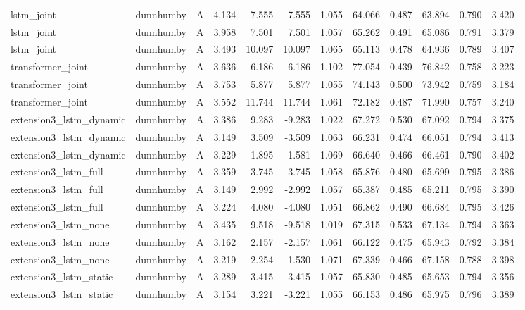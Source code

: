 \begin{table}
\begin{tabular}{lllrrrrrrrrr}
lstm_joint & dunnhumby & A & 4.134 & 7.555 & 7.555 & 1.055 & 64.066 & 0.487 & 63.894 & 0.790 & 3.420 \\
lstm_joint & dunnhumby & A & 3.958 & 7.501 & 7.501 & 1.057 & 65.262 & 0.491 & 65.086 & 0.791 & 3.379 \\
lstm_joint & dunnhumby & A & 3.493 & 10.097 & 10.097 & 1.065 & 65.113 & 0.478 & 64.936 & 0.789 & 3.407 \\
transformer_joint & dunnhumby & A & 3.636 & 6.186 & 6.186 & 1.102 & 77.054 & 0.439 & 76.842 & 0.758 & 3.223 \\
transformer_joint & dunnhumby & A & 3.753 & 5.877 & 5.877 & 1.055 & 74.143 & 0.500 & 73.942 & 0.759 & 3.184 \\
transformer_joint & dunnhumby & A & 3.552 & 11.744 & 11.744 & 1.061 & 72.182 & 0.487 & 71.990 & 0.757 & 3.240 \\
extension3_lstm_dynamic & dunnhumby & A & 3.386 & 9.283 & -9.283 & 1.022 & 67.272 & 0.530 & 67.092 & 0.794 & 3.375 \\
extension3_lstm_dynamic & dunnhumby & A & 3.149 & 3.509 & -3.509 & 1.063 & 66.231 & 0.474 & 66.051 & 0.794 & 3.413 \\
extension3_lstm_dynamic & dunnhumby & A & 3.229 & 1.895 & -1.581 & 1.069 & 66.640 & 0.466 & 66.461 & 0.790 & 3.402 \\
extension3_lstm_full & dunnhumby & A & 3.359 & 3.745 & -3.745 & 1.058 & 65.876 & 0.480 & 65.699 & 0.795 & 3.386 \\
extension3_lstm_full & dunnhumby & A & 3.149 & 2.992 & -2.992 & 1.057 & 65.387 & 0.485 & 65.211 & 0.795 & 3.390 \\
extension3_lstm_full & dunnhumby & A & 3.224 & 4.080 & -4.080 & 1.051 & 66.862 & 0.490 & 66.684 & 0.795 & 3.426 \\
extension3_lstm_none & dunnhumby & A & 3.435 & 9.518 & -9.518 & 1.019 & 67.315 & 0.533 & 67.134 & 0.794 & 3.363 \\
extension3_lstm_none & dunnhumby & A & 3.162 & 2.157 & -2.157 & 1.061 & 66.122 & 0.475 & 65.943 & 0.792 & 3.384 \\
extension3_lstm_none & dunnhumby & A & 3.219 & 2.254 & -1.530 & 1.071 & 67.339 & 0.466 & 67.158 & 0.788 & 3.398 \\
extension3_lstm_static & dunnhumby & A & 3.289 & 3.415 & -3.415 & 1.057 & 65.830 & 0.485 & 65.653 & 0.794 & 3.356 \\
extension3_lstm_static & dunnhumby & A & 3.154 & 3.221 & -3.221 & 1.055 & 66.153 & 0.486 & 65.975 & 0.796 & 3.389 \\

\end{tabular}
\end{table}
